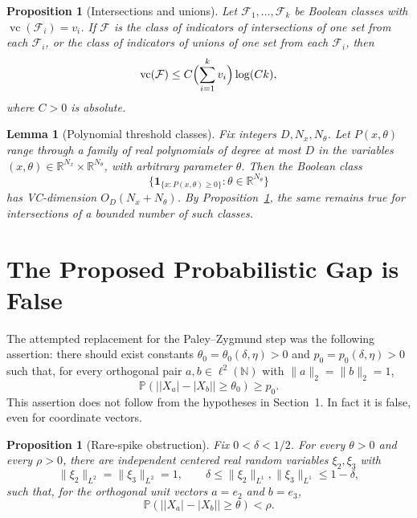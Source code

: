 \documentclass[11pt]{amsart}
\numberwithin{equation}{section}
\newtheorem{proposition}[theorem]{Proposition}
\newtheorem{lemma}[theorem]{Lemma}
\theoremstyle{definition}
\theoremstyle{remark}
\newcommand{\Prob}{\mathbb P}
\newcommand{\N}{\mathbb N}
\newcommand{\R}{\mathbb R}
\newcommand{\vc}{\operatorname{vc}}
\newcommand{\norm}[1]{\lVert #1 \rVert}
\begin{document}
\begin{proposition}[Intersections and unions]\label{prop:vc-intersection}
Let \(\mathcal F_1,\ldots,\mathcal F_k\) be Boolean classes with
\(\vc(\mathcal F_i)=v_i\).  If \(\mathcal F\) is the class of indicators of
intersections of one set from each \(\mathcal F_i\), or the class of indicators
of unions of one set from each \(\mathcal F_i\), then
\[
\vc(\mathcal F)\le C\Bigl(\sum_{i=1}^k v_i\Bigr)\log(Ck),
\]
where \(C>0\) is absolute.
\end{proposition}

\begin{lemma}[Polynomial threshold classes]\label{lem:poly-vc}
Fix integers \(D,N_x,N_\theta\).  Let \(P(x,\theta)\) range through a family of
real polynomials of degree at most \(D\) in the variables
\((x,\theta)\in\R^{N_x}\times\R^{N_\theta}\), with arbitrary parameter
\(\theta\).  Then the Boolean class
\[
        \bigl\{\mathbf 1_{\{x:P(x,\theta)\ge0\}}:\theta\in\R^{N_\theta}\bigr\}
\]
has VC-dimension \(O_D(N_x+N_\theta)\).  By
Proposition~\ref{prop:vc-intersection}, the same remains true for
intersections of a bounded number of such classes.
\end{lemma}

\section{The Proposed Probabilistic Gap is False}

The attempted replacement for the Paley--Zygmund step was the following
assertion: there should exist constants
\(\theta_0=\theta_0(\delta,\eta)>0\) and
\(p_0=p_0(\delta,\eta)>0\) such that, for every orthogonal pair
\(a,b\in\ell^2(\N)\) with \(\norm{a}_2=\norm{b}_2=1\),
\[
\Prob\left(\bigl||X_a|-|X_b|\bigr|\ge\theta_0\right)\ge p_0 .
\]
This assertion does not follow from the hypotheses in Section~1.  In fact it
is false, even for coordinate vectors.

\begin{proposition}[Rare-spike obstruction]\label{prop:rare-spike}
Fix \(0<\delta<1/2\).  For every \(\theta>0\) and every \(\rho>0\), there are
independent centered real random variables \(\xi_2,\xi_3\) with
\[
\norm{\xi_2}_{L^2}=\norm{\xi_3}_{L^2}=1,\qquad
\delta\le \norm{\xi_2}_{L^1},\norm{\xi_3}_{L^1}\le 1-\delta,
\]
such that, for the orthogonal unit vectors \(a=e_2\) and \(b=e_3\),
\[
\Prob\left(\bigl||X_a|-|X_b|\bigr|\ge\theta\right)<\rho .
\]
\end{proposition}
\end{document}
